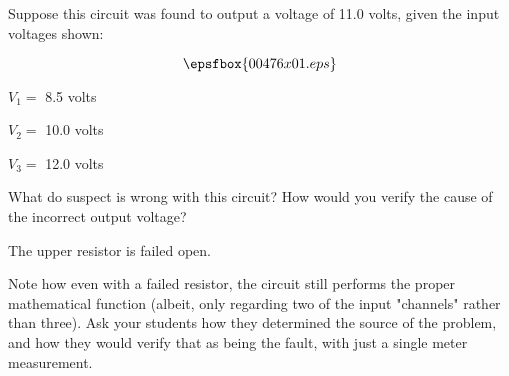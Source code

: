

Suppose this circuit was found to output a voltage of 11.0 volts, given the input voltages shown:

$$\epsfbox{00476x01.eps}$$

\medskip
\item{} $V_1 =$ 8.5 volts
\item{} $V_2 =$ 10.0 volts
\item{} $V_3 =$ 12.0 volts
\medskip

What do suspect is wrong with this circuit?  How would you verify the cause of the incorrect output voltage?







The upper resistor is failed open.







Note how even with a failed resistor, the circuit still performs the proper mathematical function (albeit, only regarding two of the input "channels" rather than three).  Ask your students how they determined the source of the problem, and how they would verify that as being the fault, with just a single meter measurement.




